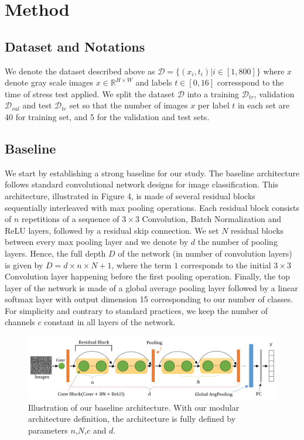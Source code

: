 \documentclass[10pt,twocolumn,letterpaper]{article}
\begin{document}
\section{Method}

\subsection{Dataset and Notations}
We denote the dataset described above as $\mathcal{D}=\{(x_i,t_i) | i \in [1,800] \}$ where $x$ denote gray scale images $x \in \mathbb{R}^{H \times W}$ and labels $t \in [0,16]$ corresspond to the time of stress test applied.
We split the dataset $\mathcal{D}$ into a training $\mathcal{D}_{tr}$, validation $\mathcal{D}_{val}$ and test $\mathcal{D}_{te}$ set so that the number of images $x$ per label $t$ in each set are 40 for training set, and 5 for the validation and test sets.

\subsection{Baseline}

We start by establishing a strong baseline for our study.
The baseline architecture follows standard convolutional network designs for image classification.
This architecture, illustrated in Figure 4, is made of several residual blocks 
sequentially interleaved with max pooling operations.
Each residual block consists of $n$ repetitions of a sequence of 
$3 \times 3$ Convolution, Batch Normalization and ReLU layers,
followed by a residual skip connection.
We set $N$ residual blocks between every max pooling layer
and we denote by $d$ the number of pooling layers.
Hence, the full depth $D$ of the network (in number of convolution layers) 
is given by $D=d \times n \times N +1$, where the term $1$ corresponds to the
initial $3 \times 3$ Convolution layer happening before the first pooling operation.
Finally, the top layer of the network is made of a global average pooling layer 
followed by a linear softmax layer with output dimension 15 corresponding to our number of classes.
For simplicity and contrary to standard practices, we keep the number of channels $c$ constant 
in all layers of the network.

\begin{figure}[h]
\centering
\includegraphics[width=0.9\linewidth]{"./figures/Figure4"}
\caption{
Illustration of our baseline architecture.
With our modular architecture definition, 
the architecture is fully defined by parameters $n$,$N$,$c$ and $d$.
}
\end{figure}
\end{document}
